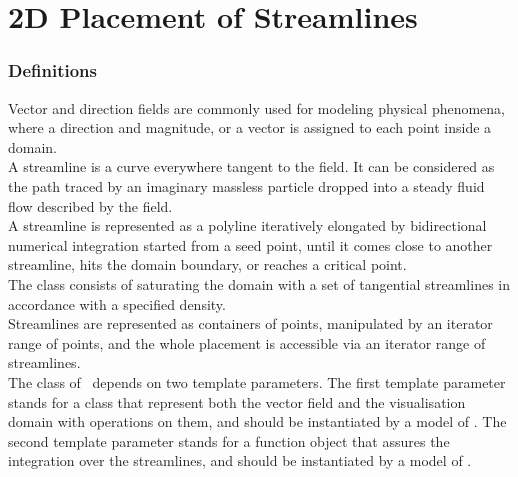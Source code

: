 
\chapter{2D Placement of Streamlines}
\label{ref_chapter_2D_Streamlines}


\subsection*{Definitions}
Vector and direction fields are commonly used for modeling physical
phenomena, where a direction and magnitude, or a vector is assigned to
each point inside a domain.\\ A streamline is a curve everywhere
tangent to the field. It can be considered as the path traced by an
imaginary massless particle dropped into a steady fluid flow described
by the field.\\ A streamline is represented as a polyline iteratively
elongated by bidirectional numerical integration started from a seed
point, until it comes close to another streamline, hits the domain
boundary, or reaches a critical point.\\ The  class consists
of saturating the domain with a set of tangential streamlines in
accordance with a specified density.\\ Streamlines are represented as
containers of points, manipulated by an iterator range of points, and the
whole placement is accessible via an iterator range of streamlines.\\ The
 class of \cgal\ depends on two
template parameters.  The first template parameter stands for a class that
represent both the vector field and the visualisation domain with operations on them, and should be instantiated by a model of .
The second template parameter stands for a function object that assures
the integration over the streamlines, and should be instantiated by a model of .

